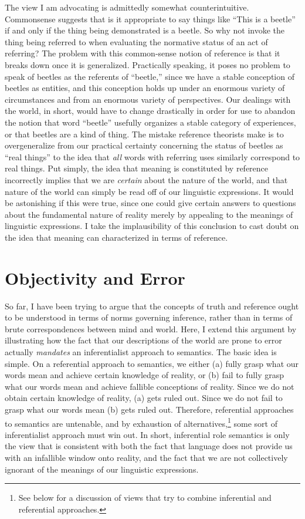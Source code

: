 The view I am advocating is admittedly somewhat counterintuitive. Commonsense suggests that is it appropriate to say things like ``This is a beetle'' if and only if the thing being demonstrated is a beetle. So why not invoke the thing being referred to when evaluating the normative status of an act of referring? The problem with this common-sense notion of reference is that it breaks down once it is generalized. Practically speaking, it poses no problem to speak of beetles as the referents of ``beetle,'' since we have a stable conception of beetles as entities, and this conception holds up under an enormous variety of circumstances and from an enormous variety of perspectives. Our dealings with the world, in short, would have to change drastically in order for use to abandon the notion that word ``beetle'' usefully organizes a stable category of experiences, or that beetles are a kind of thing. The mistake reference theorists make is to overgeneralize from our practical certainty concerning the status of beetles as ``real things'' to the idea that \textit{all} words with referring uses similarly correspond to real things. Put simply, the idea that meaning is constituted by reference incorrectly implies that we are \textit{certain} about the nature of the world, and that nature of the world can simply be read off of our linguistic expressions. It would be astonishing if this were true, since one could give certain answers to questions about the fundamental nature of reality merely by appealing to the meanings of linguistic expressions. I take the implausibility of this conclusion to cast doubt on the idea that meaning can characterized in terms of reference. 

\section{Objectivity and Error}

So far, I have been trying to argue that the concepts of truth and reference ought to be understood in terms of norms governing inference, rather than in terms of brute correspondences between mind and world. Here, I extend this argument by illustrating how the fact that our descriptions of the world are prone to error actually \textit{mandates} an inferentialist approach to semantics. The basic idea is simple. On a referential approach to semantics, we either (a) fully grasp what our words mean and achieve certain knowledge of reality, or (b) fail to fully grasp what our words mean and achieve fallible conceptions of reality. Since we do not obtain certain knowledge of reality, (a) gets ruled out. Since we do not fail to grasp what our words mean (b) gets ruled out. Therefore, referential approaches to semantics are untenable, and by exhaustion of alternatives,\footnote{See below for a discussion of views that try to combine inferential and referential approaches.} some sort of inferentialist approach must win out. In short, inferential role semantics is only the view that is consistent with both the fact that language does not provide us with an infallible window onto reality, and the fact that we are not collectively ignorant of the meanings of our linguistic expressions. 

